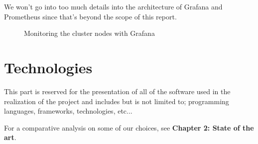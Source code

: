 \medskip
We won't go into too much details into the architecture of Grafana and Prometheus since that's beyond the scope of this report.

\begin{figure}[H]
    \centering
    \caption{Monitoring the cluster nodes with Grafana}
    \label{fig:grafana-node-monitoring}
\end{figure}

\newpage

\section{Technologies}
This part is reserved for the presentation of all of the software used in the realization of the project and includes but is not limited to; programming languages, frameworks, technologies, etc...

\medskip
For a comparative analysis on some of our choices, see \textbf {Chapter 2: State of the art}.

